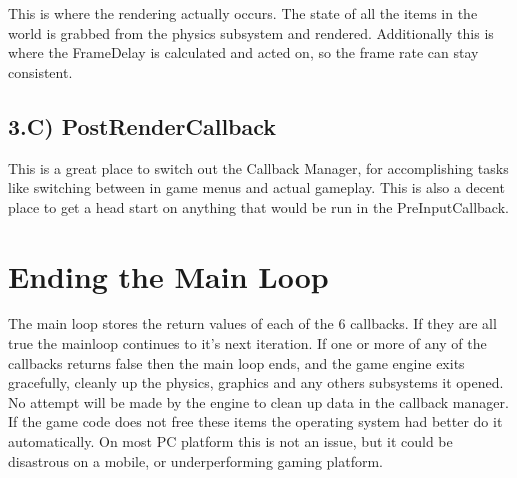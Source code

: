 This is where the rendering actually occurs. The state of all the items in the world is grabbed from the physics subsystem and rendered. Additionally this is where the FrameDelay is calculated and acted on, so the frame rate can stay consistent. \hypertarget{dd/d99/mainloop1_rendering3}{}\subsection{3.C) PostRenderCallback}\label{dd/d99/mainloop1_rendering3}
This is a great place to switch out the Callback Manager, for accomplishing tasks like switching between in game menus and actual gameplay. This is also a decent place to get a head start on anything that would be run in the PreInputCallback. \par
 \hypertarget{dd/d99/mainloop1_endingmainloop1}{}\section{Ending the Main Loop}\label{dd/d99/mainloop1_endingmainloop1}
The main loop stores the return values of each of the 6 callbacks. If they are all true the mainloop continues to it's next iteration. If one or more of any of the callbacks returns false then the main loop ends, and the game engine exits gracefully, cleanly up the physics, graphics and any others subsystems it opened. No attempt will be made by the engine to clean up data in the callback manager. If the game code does not free these items the operating system had better do it automatically. On most PC platform this is not an issue, but it could be disastrous on a mobile, or underperforming gaming platform. 